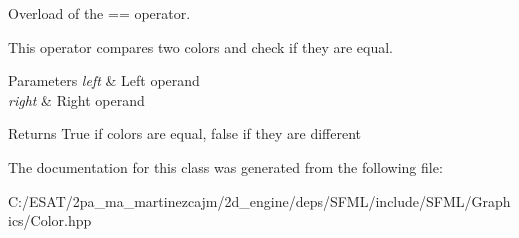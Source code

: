 Overload of the == operator. 

This operator compares two colors and check if they are equal.


\begin{DoxyParams}{Parameters}
{\em left} & Left operand \\
\hline
{\em right} & Right operand\\
\hline
\end{DoxyParams}
\begin{DoxyReturn}{Returns}
True if colors are equal, false if they are different 
\end{DoxyReturn}


The documentation for this class was generated from the following file\+:\begin{DoxyCompactItemize}
\item 
C\+:/\+E\+S\+A\+T/2pa\+\_\+ma\+\_\+martinezcajm/2d\+\_\+engine/deps/\+S\+F\+M\+L/include/\+S\+F\+M\+L/\+Graphics/Color.\+hpp\end{DoxyCompactItemize}

